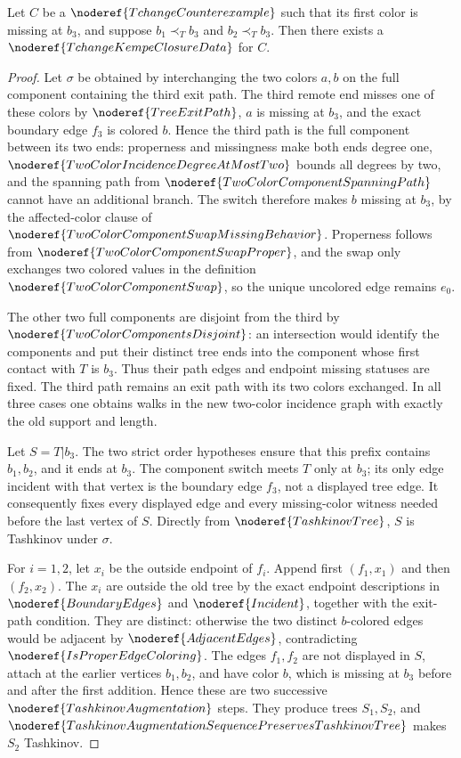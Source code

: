 \begin{lemma}
Let \(C\) be a \(\noderef{TchangeCounterexample}\) such that its first
color is missing at \(b_3\), and suppose
\(b_1\prec_T b_3\) and \(b_2\prec_T b_3\).  Then there exists a
\(\noderef{TchangeKempeClosureData}\) for \(C\).
\end{lemma}
\begin{proof}
Let \(\sigma\) be obtained by interchanging the two colors \(a,b\) on
the full component containing the third exit path.  The third remote end
misses one of these colors by \(\noderef{TreeExitPath}\),
\(a\) is missing at \(b_3\), and the exact
boundary edge \(f_3\) is colored \(b\).  Hence the third path is the full
component between its two ends: properness and missingness make both
ends degree one, \(\noderef{TwoColorIncidenceDegreeAtMostTwo}\) bounds
all degrees by two, and the spanning path from
\(\noderef{TwoColorComponentSpanningPath}\) cannot have an additional
branch.  The switch therefore makes \(b\) missing
at \(b_3\), by the affected-color clause of
\(\noderef{TwoColorComponentSwapMissingBehavior}\).  Properness follows from
\(\noderef{TwoColorComponentSwapProper}\), and the swap only exchanges
two colored values in the definition
\(\noderef{TwoColorComponentSwap}\), so the unique uncolored edge remains
\(e_0\).

The other two full components are disjoint from the third by
\(\noderef{TwoColorComponentsDisjoint}\): an
intersection would identify the components and put their distinct tree
ends into the component whose first contact with \(T\) is \(b_3\).
Thus their path edges and endpoint missing statuses are fixed.  The third
path remains an exit path with its two colors exchanged.  In all three
cases one obtains walks in the new two-color incidence graph with exactly
the old support and length.

Let \(S=T|b_3\).  The two strict order hypotheses ensure that this prefix
contains \(b_1,b_2\), and it ends at \(b_3\).  The component switch meets
\(T\) only at \(b_3\); its only edge incident with that vertex is the
boundary edge \(f_3\), not a displayed tree edge.  It consequently fixes
every displayed edge and every missing-color witness needed before the
last vertex of \(S\).  Directly from \(\noderef{TashkinovTree}\),
\(S\) is Tashkinov under \(\sigma\).

For \(i=1,2\), let \(x_i\) be the outside endpoint of \(f_i\).  Append
first \((f_1,x_1)\) and then \((f_2,x_2)\).  The \(x_i\) are outside the
old tree by the exact endpoint descriptions in
\(\noderef{BoundaryEdges}\) and \(\noderef{Incident}\), together with
the exit-path condition.  They are distinct: otherwise the
two distinct \(b\)-colored edges would be adjacent by
\(\noderef{AdjacentEdges}\), contradicting
\(\noderef{IsProperEdgeColoring}\).  The edges \(f_1,f_2\) are not
displayed in \(S\), attach at
the earlier vertices \(b_1,b_2\), and have color \(b\), which is missing
at \(b_3\) before and after the first addition.  Hence these are two
successive \(\noderef{TashkinovAugmentation}\) steps.  They produce trees
\(S_1,S_2\), and
\(\noderef{TashkinovAugmentationSequencePreservesTashkinovTree}\) makes
\(S_2\) Tashkinov.


\end{proof}
